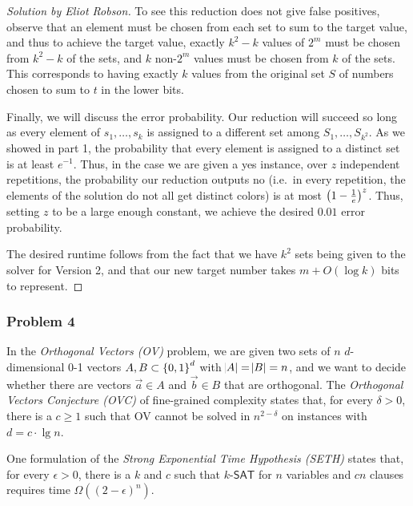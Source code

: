 \documentclass{article}
\newenvironment{solution}[1]{\begin{proof}[Solution by #1]}{\end{proof}}
\newcommand{\SAT}{\mathsf{SAT}}
\begin{document}
\begin{enumerate}
\begin{solution}{Eliot Robson}
        To see this reduction does not give false positives, observe that an element must be chosen from each set to sum to the target value, and thus to achieve the target value, exactly \(k^2 - k\) values of \(2^m\) must be chosen from \(k^2 - k\) of the sets, and \(k\) non-\(2^m\) values must be chosen from \(k\) of the sets. This corresponds to having exactly \(k\) values from the original set \(S\) of numbers chosen to sum to \(t\) in the lower bits.
        
        Finally, we will discuss the error probability. Our reduction will succeed so long as every element of \(s_1, \dots, s_k\) is assigned to a different set among \(S_1, \dots, S_{k^2}\). As we showed in part 1, the probability that every element is assigned to a distinct set is at least \(e^{-1}\). Thus, in the case we are given a yes instance, over \(z\) independent repetitions, the probability our reduction outputs no (i.e.\ in every repetition, the elements of the solution do not all get distinct colors) is at most \(\del{1 - \frac{1}{e}}^{z}\). Thus, setting \(z\) to be a large enough constant, we achieve the desired \(0.01\) error probability.
        
        The desired runtime follows from the fact that we have \(k^2\) sets being given to the solver for Version 2, and that our new target number takes \(m + O(\log k)\) bits to represent.
    \end{solution}
\end{enumerate}

\subsubsection{Problem 4}
In the \emph{Orthogonal Vectors (OV)} problem, we are given two sets of \(n\) \(d\)-dimensional 0-1 vectors \(A,B \subset \set{0,1}^d\) with \(\abs{A} = \abs{B} = n\), and we want to decide whether there are vectors \(\vec{a} \in A\) and \(\vec{b} \in B\) that are orthogonal. The \emph{Orthogonal Vectors Conjecture (OVC)} of fine-grained complexity states that, for every \(\delta > 0\), there is a \(c \geq 1\) such that OV cannot be solved in \(n^{2-\delta}\) on instances with \(d = c \cdot \lg n\).

One formulation of the \emph{Strong Exponential Time Hypothesis (SETH)} states that, for every \(\epsilon > 0\), there is a \(k\) and \(c\) such that \(k\)-\(\SAT\) for \(n\) variables and \(cn\) clauses requires time \(\Omega((2 - \epsilon)^n)\).
\end{document}
